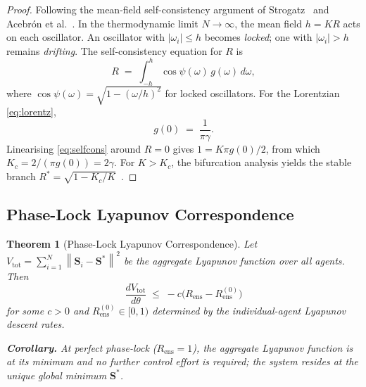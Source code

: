 \documentclass[10pt,twocolumn]{article}
\theoremstyle{plain}
\newtheorem{theorem}{Theorem}[section]
\theoremstyle{definition}
\theoremstyle{remark}
\newcommand{\norm}[1]{\left\|#1\right\|}
\newcommand{\Sstar}{\mathbf{S}^{*}}
\newcommand{\Rens}{R_{\mathrm{ens}}}
\begin{document}
\begin{proof}
Following the mean-field self-consistency argument of
Strogatz~\cite{Strogatz2000} and Acebrón et al.~\cite{Acerbron2005}.
In the thermodynamic limit $N \to \infty$, the mean field
$h = K R$ acts on each oscillator.  An oscillator with
$|\omega_i| \leq h$ becomes \emph{locked}; one with $|\omega_i| > h$
remains \emph{drifting}.  The self-consistency equation for $R$ is
\begin{equation}
  R \;=\; \int_{-h}^{h} \cos\psi(\omega)\, g(\omega)\, d\omega,
  \label{eq:selfcons}
\end{equation}
where $\cos\psi(\omega) = \sqrt{1 - (\omega/h)^2}$ for locked
oscillators.  For the Lorentzian \eqref{eq:lorentz},
\begin{equation}
  g(0) \;=\; \frac{1}{\pi\gamma}.
  \label{eq:g0}
\end{equation}
Linearising \eqref{eq:selfcons} around $R = 0$ gives
$1 = K\pi g(0)/2$, from which $K_c = 2/(\pi g(0)) = 2\gamma$.  For
$K > K_c$, the bifurcation analysis yields the stable branch
$R^* = \sqrt{1-K_c/K}$~\cite{Strogatz2000,Acerbron2005}.
\end{proof}

\subsection{Phase-Lock Lyapunov Correspondence}
\label{ssec:pllc}

\begin{theorem}[Phase-Lock Lyapunov Correspondence]
\label{thm:pllc}
Let $V_{\mathrm{tot}} = \sum_{i=1}^N \norm{\mathbf{S}_i - \Sstar}^2$
be the aggregate Lyapunov function over all agents.  Then
\begin{equation}
  \frac{dV_{\mathrm{tot}}}{d\theta}
  \;\leq\; -c\bigl(\Rens - \Rens^{(0)}\bigr)
  \label{eq:pllc}
\end{equation}
for some $c > 0$ and $\Rens^{(0)} \in [0,1)$ determined by the
individual-agent Lyapunov descent rates.

\noindent\textbf{Corollary.} At perfect phase-lock ($\Rens = 1$), the
aggregate Lyapunov function is at its minimum and no further control
effort is required; the system resides at the unique global minimum
$\Sstar$.
\end{theorem}
\end{document}
